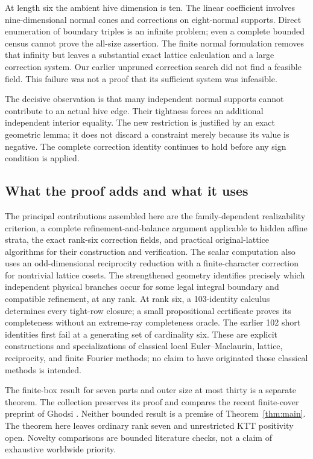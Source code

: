 \documentclass[11pt]{article}
\theoremstyle{definition}\newtheorem{definition}[theorem]{Definition}
\theoremstyle{remark}\newtheorem{remark}[theorem]{Remark}
\begin{document}
At length six the ambient hive dimension is ten. The linear coefficient
involves nine-dimensional normal cones and corrections on eight-normal
supports. Direct enumeration of boundary triples is an infinite problem;
even a complete bounded census cannot prove the all-size assertion. The
finite normal formulation removes that infinity but leaves a substantial
exact lattice calculation and a large correction system. Our earlier
unpruned correction search did not find a feasible field. This failure was
not a proof that its sufficient system was infeasible.

The decisive observation is that many independent normal supports cannot
contribute to an actual hive edge. Their tightness forces an additional
independent interior equality. The new restriction is justified by an exact
geometric lemma; it does not discard a constraint merely because its value
is negative. The complete correction identity continues to hold before any
sign condition is applied.

\subsection{What the proof adds and what it uses}
The principal contributions assembled here are the family-dependent
realizability criterion, a complete refinement-and-balance argument applicable
to hidden affine strata, the exact rank-six correction fields, and practical
original-lattice algorithms for their construction and verification.
The scalar computation also uses an odd-dimensional reciprocity reduction
with a finite-character correction for nontrivial lattice cosets.
The strengthened geometry identifies precisely which independent physical
branches occur for some legal integral boundary and compatible refinement,
at any rank. At rank six, a 103-identity calculus determines every tight-row
closure; a small propositional certificate proves its completeness without
an extreme-ray completeness oracle. The earlier 102 short identities first
fail at a generating set of cardinality six.
These are explicit constructions and specializations of classical local
Euler--Maclaurin, lattice, reciprocity, and finite Fourier methods; no claim
to have originated those classical methods is intended.

The finite-box result for seven parts and outer size at most thirty is a
separate theorem. The collection preserves its proof and compares the
recent finite-cover preprint of Ghodsi \cite{ghodsi}. Neither bounded result
is a premise of Theorem~\ref{thm:main}. The theorem here leaves ordinary
rank seven and unrestricted KTT positivity open. Novelty comparisons are
bounded literature checks, not a claim of exhaustive worldwide priority.
\end{document}
